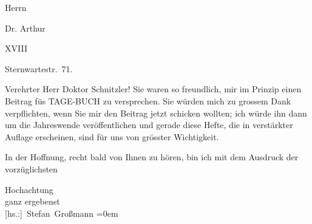 \pstart
           \raggedleft{}Herrn\pend
           
\pstart
           \raggedleft{}Dr. Arthur \pend
           
\pstart
           \raggedleft{} XVIII\pend
           
\pstart
           \raggedleft{}Sternwartestr. 71. \pend
           
\pstart\center{}Verehrter Herr Doktor Schnitzler!\pend\vspace{0.5em}
\pstart
           Sie waren so freundlich, mir im Prinzip einen Beitrag füs TAGE-BUCH zu versprechen. Sie würden mich zu grossem Dank verpflichten, wenn Sie mir den
               Beitrag jetzt schicken wollten; ich würde ihn dann um die Jahreswende veröffentlichen
               und gerade diese Hefte, die in verstärkter Auflage erscheinen, sind für uns von
               grösster Wichtigkeit.\pend
           
\pstart
           In der Hoffnung, recht bald von Ihnen zu hören, bin ich mit dem Ausdruck der
               vorzüglichsten\pend
           
\pstart
           Hochachtung{\\[\baselineskip]}ganz ergebenst{\\[\baselineskip]}\spacefill\mbox{{[}hs.:{]} Stefan Großmann}\pend
           \leftskip=0em{}\endnumbering{}  
      